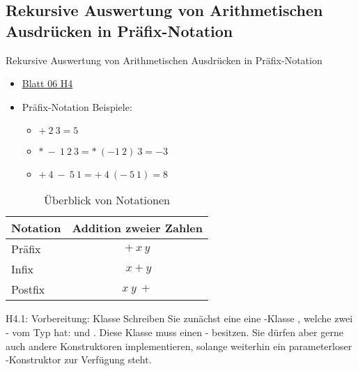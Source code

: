 \documentclass{../tuda-beamer}
\begin{document}
    \subsection{Rekursive Auswertung von Arithmetischen Ausdrücken in Präfix-Notation}
    \begin{frame}{Rekursive Auswertung von Arithmetischen Ausdrücken in Präfix-Notation}
        \begin{itemize}
            \item \href{https://moodle.informatik.tu-darmstadt.de/pluginfile.php/202303/mod_resource/content/3/uebung06.pdf}{Blatt 06 H4}
            \item Präfix-Notation Beispiele:
            \begin{itemize}
                \item \(+ \ 2 \ 3 = 5\)
                \item \(* \ - \ 1 \ 2 \ 3 = * \ (-1 \ 2) \ 3 = -3\)
                \item \(+ \ 4 \ - \ 5 \ 1 = + \ 4 \ (- \ 5 \ 1) = 8\)
            \end{itemize}
        \end{itemize}

        \begin{table}[h]
            \centering
            \begin{tabular}{lc}
                \toprule
                \textbf{Notation} & \textbf{Addition zweier Zahlen}
                \\
                \midrule
                Präfix & \(+ \ x \ y\)
                \\
                Infix & \(\ x + y\)
                \\
                Postfix & \(x \ y \ +\)
                \\
                \bottomrule
            \end{tabular}
            \caption{Überblick von Notationen}
        \end{table}
    \end{frame}

    \begin{frame}[c]{H4.1: Vorbereitung: Klasse }
        Schreiben Sie zunächst eine eine -Klasse
        , welche zwei
        - vom Typ  hat:
         und . Diese Klasse muss
        einen  - besitzen.
        Sie dürfen aber gerne auch andere Konstruktoren implementieren, solange weiterhin ein
        parameterloser -Konstruktor zur Verfügung steht.
    \end{frame}
\end{document}
